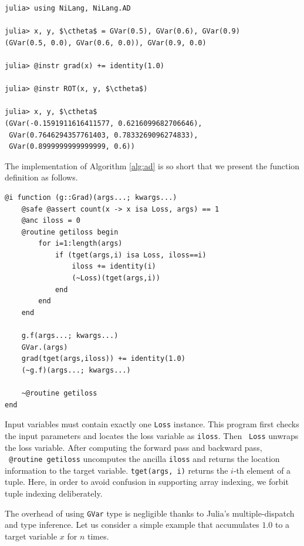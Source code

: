 \documentclass[aps,twocolumn,longbibliography,english,superscriptaddress]{revtex4-1}
\newcommand{\<}{\langle}
\renewcommand{\>}{\rangle}
\newcommand{\ctheta}{{\color{jlbase}{\rm \theta}}}
\theoremstyle{definition}\newtheorem{definition}{\textit{Definition}}
\begin{document}
\begin{minipage}{.44\textwidth}
    \begin{lstlisting}[mathescape=true]
julia> using NiLang, NiLang.AD

julia> x, y, $\ctheta$ = GVar(0.5), GVar(0.6), GVar(0.9)
(GVar(0.5, 0.0), GVar(0.6, 0.0)), GVar(0.9, 0.0)

julia> @instr grad(x) += identity(1.0)

julia> @instr ROT(x, y, $\ctheta$)

julia> x, y, $\ctheta$
(GVar(-0.1591911616411577, 0.6216099682706646),
 GVar(0.7646294357761403, 0.7833269096274833),
 GVar(0.8999999999999999, 0.6))
\end{lstlisting}
\end{minipage}


The implementation of Algorithm \ref{alg:ad} is so short that we present the function definition as follows.

\begin{minipage}{.44\textwidth}
\begin{lstlisting}
@i function (g::Grad)(args...; kwargs...)
    @safe @assert count(x -> x isa Loss, args) == 1
    @anc iloss = 0
    @routine getiloss begin
        for i=1:length(args)
            if (tget(args,i) isa Loss, iloss==i)
                iloss += identity(i)
                (~Loss)(tget(args,i))
            end
        end
    end

    g.f(args...; kwargs...)
    GVar.(args)
    grad(tget(args,iloss)) += identity(1.0)
    (~g.f)(args...; kwargs...)

    ~@routine getiloss
end
\end{lstlisting}
\end{minipage}

Input variables must contain exactly one \texttt{Loss} instance.
This program first checks the input parameters and locates the loss variable as \texttt{iloss}. Then \texttt{~Loss} unwraps the loss variable.
After computing the forward pass and backward pass, \texttt{~@routine getiloss} uncomputes the ancilla \texttt{iloss} and returns the location information to the target variable.
\texttt{tget(args, i)} returns the $i$-th element of a tuple.
Here, in order to avoid confusion in supporting array indexing, we forbit tuple indexing deliberately.

The overhead of using \texttt{GVar} type is negligible thanks to Julia's multiple-dispatch and type inference. Let us consider a simple example that accumulates $1.0$ to a target variable $x$ for $n$ times.
\end{document}
